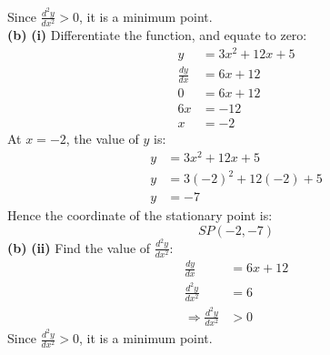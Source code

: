 \documentclass[hidelinks, a4paper, 12pt]{article}
\newcommand{\bd}{\textbf}
\newcommand{\n}{\\[\baselineskip]}
\newcommand{\thus}{\Rightarrow}
\newcommand{\dydx}{\frac{dy}{dx}}
\newcommand{\dydxx}{\frac{d^2y}{dx^2}}
\begin{document}
                Since $\dydxx > 0$, it is a minimum point.\n
                \bd{(b)} \bd{(i)} Differentiate the function, and equate to zero:
                \[\begin{split}
                    y &= 3x^2 + 12x + 5\\
                    \dydx &= 6x + 12\\
                    0 &= 6x + 12\\
                    6x &= -12\\
                    x &= -2
                \end{split}\]
                At $x=-2$, the value of $y$ is:
                \[\begin{split}
                    y &= 3x^2 + 12x + 5\\
                    y &= 3(-2)^2 + 12(-2) + 5\\
                    y &= -7
                \end{split}\]
                Hence the coordinate of the stationary point is:
                \[SP(-2, -7)\]
                \bd{(b)} \bd{(ii)} Find the value of $\dydxx$:
                \[\begin{split}
                    \dydx &= 6x + 12\\
                    \dydxx &= 6\\
                    \thus \dydxx &> 0
                \end{split}\]
                Since $\dydxx > 0$, it is a minimum point.
\end{document}

